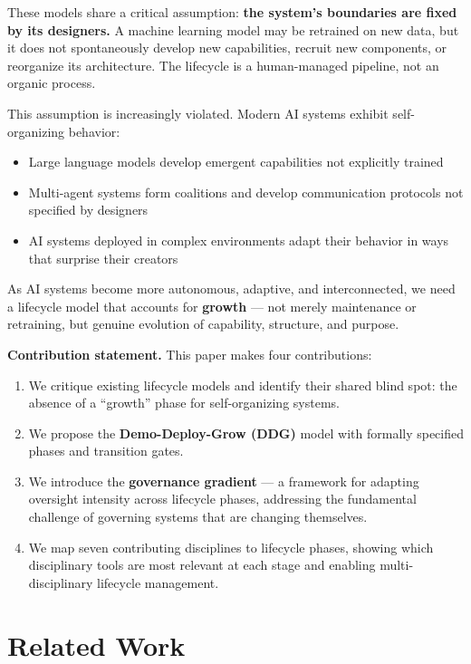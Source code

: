 \documentclass[11pt,a4paper]{article}
\begin{document}
These models share a critical assumption: \textbf{the system's boundaries are fixed by its designers.} A machine learning model may be retrained on new data, but it does not spontaneously develop new capabilities, recruit new components, or reorganize its architecture. The lifecycle is a human-managed pipeline, not an organic process.

This assumption is increasingly violated. Modern AI systems exhibit self-organizing behavior:
\begin{itemize}[nosep]
    \item Large language models develop emergent capabilities not explicitly trained \cite{wei2022}
    \item Multi-agent systems form coalitions and develop communication protocols not specified by designers \cite{foerster2016}
    \item AI systems deployed in complex environments adapt their behavior in ways that surprise their creators \cite{amodei2016}
\end{itemize}

As AI systems become more autonomous, adaptive, and interconnected, we need a lifecycle model that accounts for \textbf{growth} --- not merely maintenance or retraining, but genuine evolution of capability, structure, and purpose.

\textbf{Contribution statement.} This paper makes four contributions:
\begin{enumerate}[nosep]
    \item We critique existing lifecycle models and identify their shared blind spot: the absence of a ``growth'' phase for self-organizing systems.
    \item We propose the \textbf{Demo-Deploy-Grow (DDG)} model with formally specified phases and transition gates.
    \item We introduce the \textbf{governance gradient} --- a framework for adapting oversight intensity across lifecycle phases, addressing the fundamental challenge of governing systems that are changing themselves.
    \item We map seven contributing disciplines to lifecycle phases, showing which disciplinary tools are most relevant at each stage and enabling multi-disciplinary lifecycle management.
\end{enumerate}

\section{Related Work}
\end{document}
